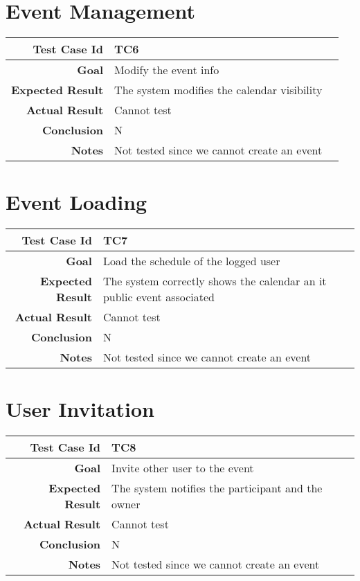 \section{Event Management}
\begin{tabularx}{\linewidth}{|r|X|X|}
\hline   {\bf Test Case Id} &  TC6\\
  \hline  {\bf Goal} & Modify the event info\\
   \hline  {\bf Expected Result} & The system modifies the calendar visibility\\
   \hline  {\bf Actual Result} & Cannot test\\
  \hline  {\bf Conclusion} & N\\
  \hline  {\bf Notes} & Not tested since we cannot create an event\\
  \hline
  
\end{tabularx}



\section{Event Loading}
\begin{tabularx}{\linewidth}{|r|X|X|}
\hline   {\bf Test Case Id} &  TC7\\
  \hline  {\bf Goal} & Load the schedule of the logged user\\
 
  \hline  {\bf Expected Result} & The system correctly shows the calendar an it public event associated\\

    \hline  {\bf Actual Result} & Cannot test\\
  \hline  {\bf Conclusion} & N\\
  \hline  {\bf Notes} & Not tested since we cannot create an event\\
  \hline
  
\end{tabularx}

\section{User Invitation}
\begin{tabularx}{\linewidth}{|r|X|X|}
\hline   {\bf Test Case Id} &  TC8\\
  \hline  {\bf Goal} & Invite other user to the event\\
 
  \hline  {\bf Expected Result} & The system notifies the participant and the owner\\
  \hline  {\bf Actual Result} & Cannot test\\
  \hline  {\bf Conclusion} & N\\
  \hline  {\bf Notes} & Not tested since we cannot create an event\\  \hline
  
\end{tabularx}


